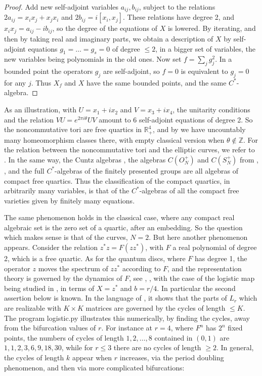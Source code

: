 \documentclass[11pt]{amsart}
\theoremstyle{definition}
\begin{document}
\begin{proof}
Add new self-adjoint variables $a_{ij},b_{ij}$, subject to the relations $2a_{ij}=x_ix_j+x_jx_i$ and $2b_{ij}=i[x_i,x_j]$. These relations have degree 2, and $x_ix_j=a_{ij}-ib_{ij}$, so the degree of the equations of $X$ is lowered. By iterating, and then by taking real and imaginary parts, we obtain a description of $X$ by self-adjoint equations $g_1=\ldots=g_s=0$ of degree $\leq2$, in a bigger set of variables, the new variables being polynomials in the old ones. Now set $f=\sum_jg_j^2$. In a bounded point the operators $g_j$ are self-adjoint, so $f=0$ is equivalent to $g_j=0$ for any $j$. Thus $X_f$ and $X$ have the same bounded points, and the same $C^*$-algebra.
\end{proof}

As an illustration, with $U=x_1+ix_2$ and $V=x_3+ix_4$, the unitarity conditions and the relation $VU=e^{2\pi i\theta}UV$ amount to 6 self-adjoint equations of degree 2. So the noncommutative tori are free quartics in $\mathbb R^4_+$, and by \cite{rie} we have uncountably many homeomorphism classes there, with empty classical version when $\theta\notin\mathbb Z$. For the relation between the noncommutative tori and the elliptic curves, we refer to \cite{mar}. In the same way, the Cuntz algebras \cite{cun}, the algebras $C(O_N^+)$ and $C(S_N^+)$ from \cite{wan}, \cite{wa2}, and the full $C^*$-algebras of the finitely presented groups are all algebras of compact free quartics. Thus the classification of the compact quartics, in arbitrarily many variables, is that of the $C^*$-algebras of all the compact free varieties given by finitely many equations.

The same phenomenon holds in the classical case, where any compact real algebraic set is the zero set of a quartic, after an embedding. So the question which makes sense is that of the curves, $N=2$. But here another phenomenon appears. Consider the relation $z^*z=F(zz^*)$, with $F$ a real polynomial of degree 2, which is a free quartic. As for the quantum discs, where $F$ has degree 1, the operator $z$ moves the spectrum of $zz^*$ according to $F$, and the representation theory is governed by the dynamics of $F$, see \cite{os1}, \cite{os2}, with the case of the logistic map being studied in \cite{crm}, in terms of $X=z^*$ and $b=r/4$. In particular the second assertion below is known. In the language of \cite{bbi}, it shows that the parts of $L_r$ which are realizable with $K\times K$ matrices are governed by the cycles of length $\leq K$. The program logistic.py illustrates this numerically, by finding the cycles, away from the bifurcation values of $r$. For instance at $r=4$, where $F^n$ has $2^n$ fixed points, the numbers of cycles of length $1,2,\ldots,8$ contained in $(0,1)$ are $1,1,2,3,6,9,18,30$, while for $r\leq3$ there are no cycles of length $\geq2$. In general, the cycles of length $k$ appear when $r$ increases, via the period doubling phenomenon, and then via more complicated bifurcations:
\end{document}
